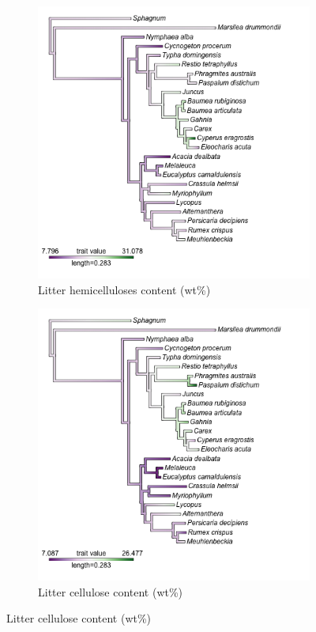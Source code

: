 \documentclass{article}
\begin{document}
\begin{figure}[htb]\ContinuedFloat
    \centering
	\begin{subfigure}[h]{0.7\textwidth}
		\includegraphics[width=\linewidth]{figs/phylo_HC.png}
		\caption{Litter hemicelluloses content (wt\%)}
		\label{Fig:phyHC}
	\end{subfigure} %
	\hfill
	\begin{subfigure}[h]{0.7\textwidth}
		\includegraphics[width=\linewidth]{figs/phylo_CL.png}
		\caption{Litter cellulose content (wt\%)}
		\label{Fig:phyCL}
	\end{subfigure}		
\end{figure}
\end{document}
